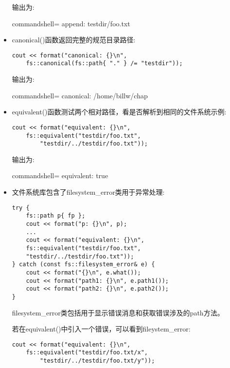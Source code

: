 \begin{itemize}
输出为:

\begin{tcblisting}{commandshell={}}
append: testdir/foo.txt
\end{tcblisting}

\item 
canonical()函数返回完整的规范目录路径:

\begin{lstlisting}[style=styleCXX]
cout << format("canonical: {}\n",
	fs::canonical(fs::path{ "." } /= "testdir"));
\end{lstlisting}

输出为:

\begin{tcblisting}{commandshell={}}
canonical: /home/billw/chap
\end{tcblisting}

\item 
equivalent()函数测试两个相对路径，看是否解析到相同的文件系统示例:

\begin{lstlisting}[style=styleCXX]
cout << format("equivalent: {}\n",
	fs::equivalent("testdir/foo.txt",
		"testdir/../testdir/foo.txt"));
\end{lstlisting}

输出为:

\begin{tcblisting}{commandshell={}}
equivalent: true
\end{tcblisting}

\item 
文件系统库包含了filesystem\_error类用于异常处理:

\begin{lstlisting}[style=styleCXX]
try {
	fs::path p{ fp };
	cout << format("p: {}\n", p);
	...
	cout << format("equivalent: {}\n",
	fs::equivalent("testdir/foo.txt",
	"testdir/../testdir/foo.txt"));
} catch (const fs::filesystem_error& e) {
	cout << format("{}\n", e.what());
	cout << format("path1: {}\n", e.path1());
	cout << format("path2: {}\n", e.path2());
}
\end{lstlisting}

filesystem\_error类包括用于显示错误消息和获取错误涉及的path方法。

若在equivalent()中引入一个错误，可以看到fileystem\_error:

\begin{lstlisting}[style=styleCXX]
cout << format("equivalent: {}\n",
	fs::equivalent("testdir/foo.txt/x",
		"testdir/../testdir/foo.txt/y"));
\end{lstlisting}


\end{itemize}
